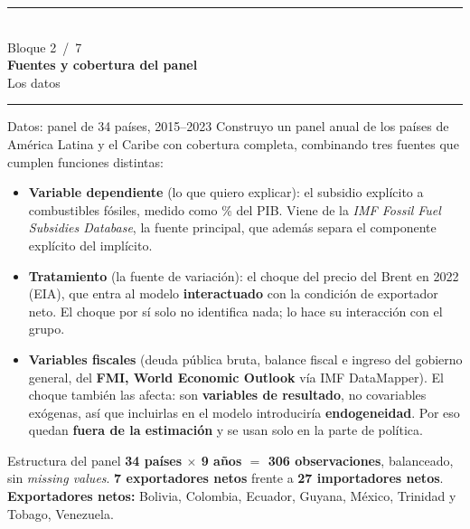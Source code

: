 \documentclass[aspectratio=169,10pt]{beamer}
\newcommand{\key}[1]{{\bfseries\color{AcentoRojo}#1}}
\newcommand{\divisor}[3]{%
  {\setbeamertemplate{footline}{}%
   \begin{frame}[plain]
     \vfill
     \begin{center}
       {\color{AcentoRojo}\rule{2.6cm}{1.2pt}}\\[0.7em]
       {\scriptsize\color{GrisMedio}Bloque #1 \,/\, 7}\\[0.6em]
       {\Large\color{Carbon}\bfseries #2}\\[0.45em]
       {\color{GrisMedio}#3}\\[0.7em]
       {\color{AcentoRojo}\rule{2.6cm}{1.2pt}}
     \end{center}
     \vfill
   \end{frame}}}
\begin{document}
\divisor{2}{Fuentes y cobertura del panel}{Los datos}

\begin{frame}{Datos: panel de 34 países, 2015--2023}
  \small
  Construyo un panel anual de los países de América Latina y el Caribe con cobertura completa,
  combinando tres fuentes que cumplen funciones distintas:
  \begin{itemize}
    \item \textbf{Variable dependiente} (lo que quiero explicar): el subsidio explícito a
          combustibles fósiles, medido como \% del PIB. Viene de la \emph{IMF Fossil Fuel
          Subsidies Database}, la fuente principal, que además separa el componente explícito
          del implícito.
    \item \textbf{Tratamiento} (la fuente de variación): el choque del precio del Brent en 2022
          (EIA), que entra al modelo \textbf{interactuado} con la condición de exportador neto.
          El choque por sí solo no identifica nada; lo hace su interacción con el grupo.
    \item \textbf{Variables fiscales} (deuda pública bruta, balance fiscal e ingreso del
          gobierno general, del \textbf{FMI, World Economic Outlook} vía IMF DataMapper). El choque
          también las afecta: son \textbf{variables de resultado}, no covariables exógenas, así que
          incluirlas en el modelo introduciría \textbf{endogeneidad}. Por eso quedan \textbf{fuera
          de la estimación} y se usan solo en la parte de política.
  \end{itemize}

  \begin{block}{Estructura del panel}
    \key{34 países $\times$ 9 años $=$ 306 observaciones}, balanceado, sin \emph{missing values}.
    \textbf{7 exportadores netos} frente a \textbf{27 importadores netos}.\\[0.3em]
    \textbf{Exportadores netos:} Bolivia, Colombia, Ecuador, Guyana, México, Trinidad y Tobago,
    Venezuela.
  \end{block}

\end{frame}
\end{document}
